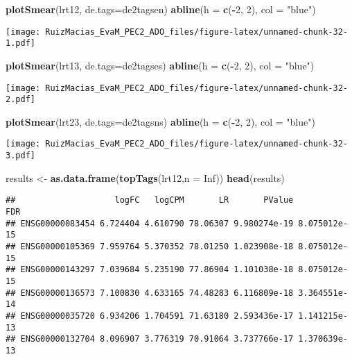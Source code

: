 \documentclass[
]{article}
\newenvironment{Shaded}{\begin{snugshade}}{\end{snugshade}}
\newcommand{\DataTypeTok}[1]{\textcolor[rgb]{0.13,0.29,0.53}{#1}}
\newcommand{\DecValTok}[1]{\textcolor[rgb]{0.00,0.00,0.81}{#1}}
\newcommand{\KeywordTok}[1]{\textcolor[rgb]{0.13,0.29,0.53}{\textbf{#1}}}
\newcommand{\NormalTok}[1]{#1}
\newcommand{\OperatorTok}[1]{\textcolor[rgb]{0.81,0.36,0.00}{\textbf{#1}}}
\newcommand{\OtherTok}[1]{\textcolor[rgb]{0.56,0.35,0.01}{#1}}
\newcommand{\StringTok}[1]{\textcolor[rgb]{0.31,0.60,0.02}{#1}}
\begin{document}
\begin{Shaded}
\begin{Highlighting}[]
\KeywordTok{plotSmear}\NormalTok{(lrt12, }\DataTypeTok{de.tags=}\NormalTok{de2tagsen)}
\KeywordTok{abline}\NormalTok{(}\DataTypeTok{h =} \KeywordTok{c}\NormalTok{(}\OperatorTok{-}\DecValTok{2}\NormalTok{, }\DecValTok{2}\NormalTok{), }\DataTypeTok{col =} \StringTok{"blue"}\NormalTok{)}
\end{Highlighting}
\end{Shaded}

\texttt{[image: RuizMacias\_EvaM\_PEC2\_ADO\_files/figure-latex/unnamed-chunk-32-1.pdf]}

\begin{Shaded}
\begin{Highlighting}[]
\KeywordTok{plotSmear}\NormalTok{(lrt13, }\DataTypeTok{de.tags=}\NormalTok{de2tagses)}
\KeywordTok{abline}\NormalTok{(}\DataTypeTok{h =} \KeywordTok{c}\NormalTok{(}\OperatorTok{-}\DecValTok{2}\NormalTok{, }\DecValTok{2}\NormalTok{), }\DataTypeTok{col =} \StringTok{"blue"}\NormalTok{)}
\end{Highlighting}
\end{Shaded}

\texttt{[image: RuizMacias\_EvaM\_PEC2\_ADO\_files/figure-latex/unnamed-chunk-32-2.pdf]}

\begin{Shaded}
\begin{Highlighting}[]
\KeywordTok{plotSmear}\NormalTok{(lrt23, }\DataTypeTok{de.tags=}\NormalTok{de2tagsns)}
\KeywordTok{abline}\NormalTok{(}\DataTypeTok{h =} \KeywordTok{c}\NormalTok{(}\OperatorTok{-}\DecValTok{2}\NormalTok{, }\DecValTok{2}\NormalTok{), }\DataTypeTok{col =} \StringTok{"blue"}\NormalTok{)}
\end{Highlighting}
\end{Shaded}

\texttt{[image: RuizMacias\_EvaM\_PEC2\_ADO\_files/figure-latex/unnamed-chunk-32-3.pdf]}

\begin{Shaded}
\begin{Highlighting}[]
\NormalTok{results <-}\StringTok{ }\KeywordTok{as.data.frame}\NormalTok{(}\KeywordTok{topTags}\NormalTok{(lrt12,}\DataTypeTok{n =} \OtherTok{Inf}\NormalTok{))}
\KeywordTok{head}\NormalTok{(results)}
\end{Highlighting}
\end{Shaded}

\begin{verbatim}
##                    logFC   logCPM       LR       PValue          FDR
## ENSG00000083454 6.724404 4.610790 78.06307 9.980274e-19 8.075012e-15
## ENSG00000105369 7.959764 5.370352 78.01250 1.023908e-18 8.075012e-15
## ENSG00000143297 7.039684 5.235190 77.86904 1.101038e-18 8.075012e-15
## ENSG00000136573 7.100830 4.633165 74.48283 6.116809e-18 3.364551e-14
## ENSG00000035720 6.934206 1.704591 71.63180 2.593436e-17 1.141215e-13
## ENSG00000132704 8.096907 3.776319 70.91064 3.737766e-17 1.370639e-13
\end{verbatim}
\end{document}

